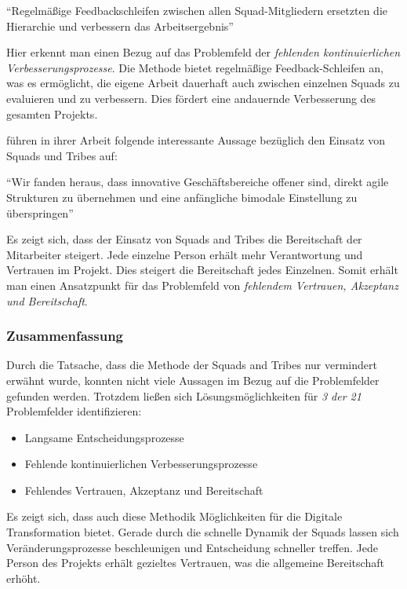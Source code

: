 \begin{center}
	``Regelmäßige Feedbackschleifen zwischen allen Squad-Mitgliedern ersetzten die Hierarchie und verbessern das Arbeitsergebnis'' \cite[S. 98]{heinemann_digitale_2016}
\end{center}

Hier erkennt man einen Bezug auf das Problemfeld der \textit{fehlenden kontinuierlichen Verbesserungsprozesse}. Die Methode bietet regelmäßige Feedback-Schleifen an, was es ermöglicht, die eigene Arbeit dauerhaft auch zwischen einzelnen Squads zu evaluieren und zu verbessern. Dies fördert eine andauernde Verbesserung des gesamten Projekts.

 führen in ihrer Arbeit folgende interessante Aussage bezüglich den Einsatz von Squads und Tribes auf:

\begin{center}
	``Wir fanden heraus, dass innovative Geschäftsbereiche offener sind, direkt agile Strukturen zu übernehmen und eine anfängliche bimodale Einstellung zu überspringen'' \cite[S. 9]{gerster_how_2019}
\end{center}

Es zeigt sich, dass der Einsatz von Squads and Tribes die Bereitschaft der Mitarbeiter steigert. Jede einzelne Person erhält mehr Verantwortung und Vertrauen im Projekt. Dies steigert die Bereitschaft jedes Einzelnen. Somit erhält man einen Ansatzpunkt für das Problemfeld von \textit{fehlendem Vertrauen, Akzeptanz und Bereitschaft}.

\subsubsection{Zusammenfassung}

Durch die Tatsache, dass die Methode der Squads and Tribes nur vermindert erwähnt wurde, konnten nicht viele Aussagen im Bezug auf die Problemfelder gefunden werden. Trotzdem ließen sich Lösungsmöglichkeiten für \textit{3 der 21} Problemfelder identifizieren:

 \begin{itemize}[noitemsep, topsep=0pt]
 	\item Langsame Entscheidungsprozesse
 	\item Fehlende kontinuierlichen Verbesserungsprozesse
 	\item Fehlendes Vertrauen, Akzeptanz und Bereitschaft
 \end{itemize}

Es zeigt sich, dass auch diese Methodik Möglichkeiten für die Digitale Transformation bietet. Gerade durch die schnelle Dynamik der Squads lassen sich Veränderungsprozesse beschleunigen und Entscheidung schneller treffen. Jede Person des Projekts erhält gezieltes Vertrauen, was die allgemeine Bereitschaft erhöht.


